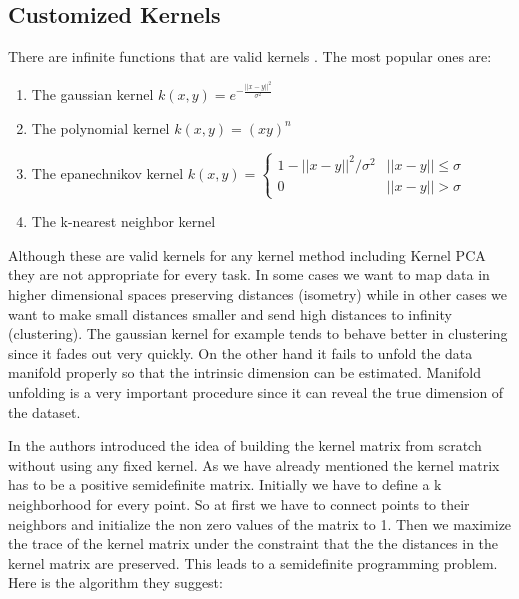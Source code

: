 \documentclass[12pt,letterpaper,doublespaced,ETD,dvips,proposal]{gtthesis}
\begin{document}
\begin{Body}
\subsection{Customized Kernels}
\label{Customized_Kernels}
There are infinite functions
that are valid kernels \cite{shawetaylor2004kmp}. The most popular ones are:
\begin{enumerate}
  \item The gaussian kernel $k(x, y)=e^{-\frac{||x-y||^2}{\sigma^2}}$
  \item The polynomial kernel $k(x, y)=(xy)^n$
  \item The epanechnikov kernel $k(x, y)=\left\{ \begin{array}{cc}
                                                  1-||x-y||^2/\sigma^2 & ||x-y||\leq\sigma \\
                                                  0                    & ||x-y||>\sigma
                                                \end{array} \right.$
  \item The k-nearest neighbor kernel
\end{enumerate}

Although these are valid kernels for any kernel method including
Kernel PCA they are not appropriate for every task. In some cases we
want to map data in higher dimensional spaces preserving distances
(isometry) while in other cases we want to make small distances
smaller and send high distances to infinity (clustering). The
gaussian kernel for example tends to behave better in clustering
since it fades out very quickly. On the other hand it fails to
unfold the data manifold properly so that the intrinsic dimension
can be estimated. Manifold unfolding is a very important procedure
since it can reveal the true dimension of the dataset.

In \cite{weinberger2004lkm} the authors introduced the idea of building the kernel matrix
from scratch without using any fixed kernel. As we have already
mentioned the kernel matrix has to be a positive semidefinite
matrix. Initially we have to define a k neighborhood  for every
point. So at first we have to connect points to their neighbors and
initialize the non zero values of the matrix to 1. Then we
maximize the trace of the kernel matrix under the constraint that
the the distances in the kernel matrix are preserved. This leads to
a semidefinite programming problem. Here is the algorithm they
suggest:

\vspace{1cm}


\end{Body}
\end{document}
